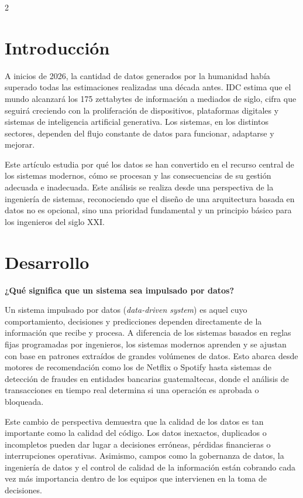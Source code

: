 \documentclass[10pt,spanish,Letterpaper,openany]{book}
\let\origtextbf\textbf
\renewcommand{\textbf}[1]{{\color{textlinetitle}\origtextbf{#1}}}
\begin{document}
\begin {multicols}{2}

\section{Introducción}\label{introducciuxf3n-12}

A inicios de 2026, la cantidad de datos generados por la humanidad había superado todas las estimaciones realizadas una década antes. IDC estima que el mundo alcanzará los 175 zettabytes de información a mediados de siglo, cifra que seguirá creciendo con la proliferación de dispositivos, plataformas digitales y sistemas de inteligencia artificial generativa. Los sistemas, en los distintos sectores, dependen del flujo constante de datos para funcionar, adaptarse y mejorar.

Este artículo estudia por qué los datos se han convertido en el recurso central de los sistemas modernos, cómo se procesan y las consecuencias de su gestión adecuada e inadecuada. Este análisis se realiza desde una perspectiva de la ingeniería de sistemas, reconociendo que el diseño de una arquitectura basada en datos no es opcional, sino una prioridad fundamental y un principio básico para los ingenieros del siglo XXI.

\section{Desarrollo}\label{desarrollo-4}

\textbf{¿Qué significa que un sistema sea impulsado por datos?}

Un sistema impulsado por datos (\emph{data-driven system}) es aquel cuyo comportamiento, decisiones y predicciones dependen directamente de la información que recibe y procesa. A diferencia de los sistemas basados en reglas fijas programadas por ingenieros, los sistemas modernos aprenden y se ajustan con base en patrones extraídos de grandes volúmenes de datos. Esto abarca desde motores de recomendación como los de Netflix o Spotify hasta sistemas de detección de fraudes en entidades bancarias guatemaltecas, donde el análisis de transacciones en tiempo real determina si una operación es aprobada o bloqueada.

Este cambio de perspectiva demuestra que la calidad de los datos es tan importante como la calidad del código. Los datos inexactos, duplicados o incompletos pueden dar lugar a decisiones erróneas, pérdidas financieras o interrupciones operativas. Asimismo, campos como la gobernanza de datos, la ingeniería de datos y el control de calidad de la información están cobrando cada vez más importancia dentro de los equipos que intervienen en la toma de decisiones.


\end{multicols}
\end{document}
